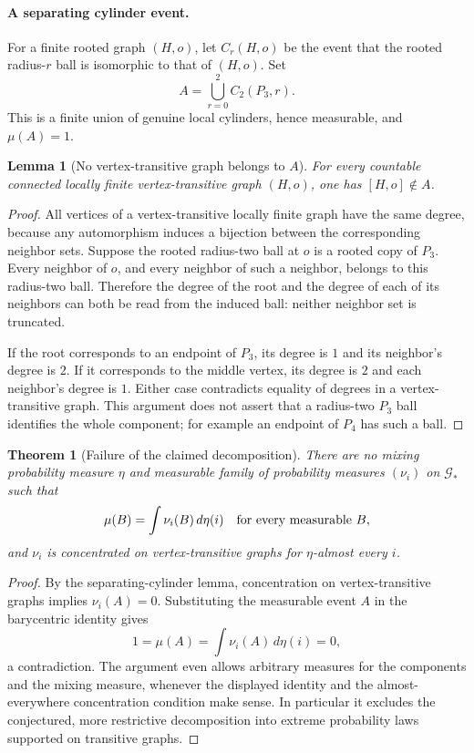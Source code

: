 \documentclass[11pt]{article}
\newtheorem{theorem}{Theorem}
\newtheorem{lemma}{Lemma}
\newcommand{\Gstar}{\mathcal G_*}
\begin{document}
\newpage
\paragraph{A separating cylinder event.}
For a finite rooted graph $(H,o)$, let $C_r(H,o)$ be the event that the
rooted radius-$r$ ball is isomorphic to that of $(H,o)$.  Set
\[
 A=\bigcup_{r=0}^2 C_2(P_3,r).
\]
This is a finite union of genuine local cylinders, hence measurable,
and $\mu(A)=1$.

\begin{lemma}[No vertex-transitive graph belongs to $A$]
For every countable connected locally finite vertex-transitive graph
$(H,o)$, one has $[H,o]\notin A$.
\end{lemma}
\begin{proof}
All vertices of a vertex-transitive locally finite graph have the same
degree, because any automorphism induces a bijection between the
corresponding neighbor sets.  Suppose the rooted radius-two ball at $o$
is a rooted copy of $P_3$.  Every neighbor of $o$, and every neighbor
of such a neighbor, belongs to this radius-two ball.  Therefore the
degree of the root and the degree of each of its neighbors can both
be read from the induced ball: neither neighbor set is truncated.

If the root corresponds to an endpoint of $P_3$, its degree is $1$
and its neighbor's degree is $2$.  If it corresponds to the middle
vertex, its degree is $2$ and each neighbor's degree is $1$.  Either
case contradicts equality of degrees in a vertex-transitive graph.
This argument does not assert that a radius-two $P_3$ ball identifies
the whole component; for example an endpoint of $P_4$ has such a ball.
\end{proof}

\newpage
\begin{theorem}[Failure of the claimed decomposition]
There are no mixing probability measure $\eta$ and measurable family
of probability measures $(\nu_i)$ on $\Gstar$ such that
\[
 \mu(B)=\int \nu_i(B)\,d\eta(i)
 \quad\hbox{for every measurable } B,
\]
and $\nu_i$ is concentrated on vertex-transitive graphs for
$\eta$-almost every $i$.
\end{theorem}
\begin{proof}
By the separating-cylinder lemma, concentration on vertex-transitive
graphs implies $\nu_i(A)=0$.  Substituting the measurable event $A$
in the barycentric identity gives
\[
 1=\mu(A)=\int \nu_i(A)\,d\eta(i)=0,
\]
a contradiction.  The argument even allows arbitrary measures for
the components and the mixing measure, whenever the displayed identity
and the almost-everywhere concentration condition make sense.  In
particular it excludes the conjectured, more restrictive decomposition
into extreme probability laws supported on transitive graphs.
\end{proof}
\end{document}
